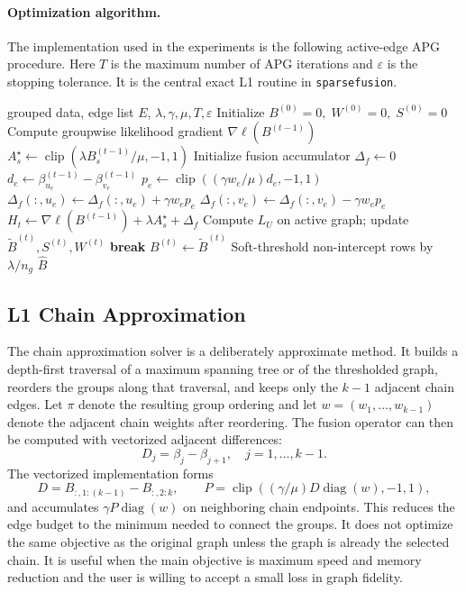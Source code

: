 \documentclass[twoside,11pt]{article}
\newcommand{\norm}[1]{\left\lVert #1 \right\rVert}
\newcommand{\sparsefusion}{\texttt{sparsefusion}\xspace}
\DeclareMathOperator{\clip}{clip}
\begin{document}
\paragraph{Optimization algorithm.}
The implementation used in the experiments is the following active-edge APG
procedure. Here $T$ is the maximum number of APG iterations and $\varepsilon$
is the stopping tolerance. It is the central exact L1 routine in \sparsefusion.
\begin{algorithm}[H]
\caption{Active-Edge Operator APG (\texttt{operator})}
\label{alg:active_edge_operator}
\begin{algorithmic}[1]
\Require grouped data, edge list $E$, $\lambda,\gamma,\mu,T,\varepsilon$
\State Initialize $B^{(0)}=0,\;W^{(0)}=0,\;S^{(0)}=0$
  \State Compute groupwise likelihood gradient $\nabla \ell(B^{(t-1)})$
  \State $A_s^\star \gets \clip(\lambda B_s^{(t-1)}/\mu,-1,1)$
  \State Initialize fusion accumulator $\Delta_f \gets 0$
     \State $d_e \gets \beta_{u_e}^{(t-1)}-\beta_{v_e}^{(t-1)}$
     \State $p_e \gets \clip((\gamma w_e/\mu)d_e,-1,1)$
     \State $\Delta_f(:,u_e) \gets \Delta_f(:,u_e)+\gamma w_e p_e$
     \State $\Delta_f(:,v_e) \gets \Delta_f(:,v_e)-\gamma w_e p_e$
  \EndFor
  \State $H_t \gets \nabla \ell(B^{(t-1)}) + \lambda A_s^\star + \Delta_f$
  \State Compute $L_U$ on active graph; update $\tilde B^{(t)},S^{(t)},W^{(t)}$
  \If{$\norm{\tilde B^{(t)}-B^{(t-1)}}_1 < \varepsilon p$}
    \State \textbf{break}
  \EndIf
  \State $B^{(t)}\gets \tilde B^{(t)}$
\EndFor
\State Soft-threshold non-intercept rows by $\lambda/n_g$
\State \Return $\hat B$
\end{algorithmic}
\end{algorithm}

\subsection{L1 Chain Approximation}

The chain approximation solver is a deliberately approximate method. It builds a
depth-first traversal of a maximum spanning tree or of the thresholded graph,
reorders the groups along that traversal, and keeps only the $k-1$ adjacent
chain edges. Let $\pi$ denote the resulting group ordering and let
$w=(w_1,\ldots,w_{k-1})$ denote the adjacent chain weights after reordering.
The fusion operator can then be computed with vectorized adjacent differences:
\[
  D_j = \beta_j-\beta_{j+1}, \quad j=1,\ldots,k-1.
\]
The vectorized implementation forms
\[
  D = B_{:,1:(k-1)} - B_{:,2:k}, \qquad
  P = \clip((\gamma/\mu)D\operatorname{diag}(w),-1,1),
\]
and accumulates $\gamma P\operatorname{diag}(w)$ on neighboring chain
endpoints.
This reduces the edge budget to the minimum needed to connect the groups. It
does not optimize the same objective as the original graph unless the graph is
already the selected chain. It is useful when the main objective is maximum
speed and memory reduction and the user is willing to accept a small loss in
graph fidelity.
\end{document}

